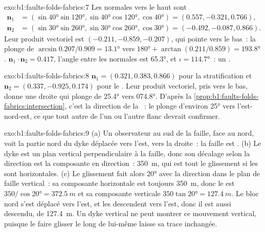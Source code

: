 \begin{solution}{exo:b1:faults-folds-fabrics:7}
Les normales vers le haut sont
\begin{align*}
  \mathbf n_1 &= (\sin\ang{40}\sin\ang{120}, \sin\ang{40}\cos\ang{120}, \cos\ang{40}) = (0.557, -0.321, 0.766),\\
  \mathbf n_2 &= (\sin\ang{30}\sin\ang{260}, \sin\ang{30}\cos\ang{260}, \cos\ang{30}) = (-0.492, -0.087, 0.866).
\end{align*}
Leur produit vectoriel est
$(-0.211, -0.859, -0.207)$, qui pointe vers le bas~: la  plonge de
$\arcsin 0.207/0.909 = \ang{13.1}$ vers $\ang{180} + \arctan(0.211/0.859) =
\ang{193.8}$. $\mathbf n_1\cdot\mathbf n_2 = 0.417$, l'angle entre les
normales est \ang{65.3}, et $\iota = \ang{114.7}$~: un .
\end{solution}

\begin{solution}{exo:b1:faults-folds-fabrics:8}
$\mathbf n_1 = (0.321, 0.383, 0.866)$ pour la stratification et
$\mathbf n_2 = (0.337, -0.925, 0.174)$ pour le . Leur produit vectoriel,
pris vers le bas, donne une droite qui plonge de \ang{25.4} vers \ang{074.8}. D'après la
\cref{prop:b1:faults-folds-fabrics:intersection}, c'est la direction de la
~: le  plonge d'environ \ang{25} vers l'est-nord-est, ce que
tout autre  de l'un ou l'autre flanc devrait confirmer.
\end{solution}

\begin{solution}{exo:b1:faults-folds-fabrics:9}
(a) Un observateur au sud de la faille, face au nord, voit la partie nord du
dyke déplacée vers l'est, vers la droite~: la faille est . (b) Le dyke est
un plan vertical perpendiculaire à la faille, donc son décalage selon la direction est
la composante en direction~: \qty{350}{m}, qui est tout le glissement si les
 sont horizontales. (c) Le glissement fait alors \ang{20} avec la direction
dans le plan de faille vertical~: sa composante horizontale est toujours \qty{350}{m},
donc le  est $350/\cos\ang{20} = \qty{372.5}{m}$ et sa composante
verticale $350\tan\ang{20} = \qty{127.4}{m}$. Le bloc nord s'est déplacé vers l'est,
et les  descendent vers l'est, donc il est aussi descendu, de
\qty{127.4}{m}. Un dyke vertical ne peut montrer ce mouvement vertical, puisque
le faire glisser le long de lui-même laisse sa trace inchangée.
\end{solution}

